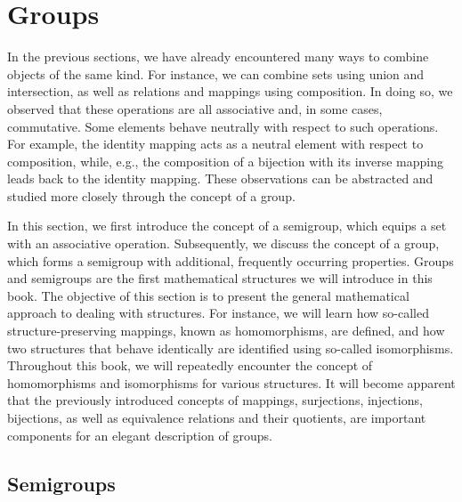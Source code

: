 \section{Groups}

In the previous sections, we have already encountered many ways to combine objects of the same kind. For instance, we can combine sets using union and intersection, as well as relations and mappings using composition. In doing so, we observed that these operations are all associative and, in some cases, commutative. Some elements behave neutrally with respect to such operations. For example, the identity mapping acts as a neutral element with respect to composition, while, e.g., the composition of a bijection with its inverse mapping leads back to the identity mapping. These observations can be abstracted and studied more closely through the concept of a group.

In this section, we first introduce the concept of a semigroup, which equips a set with an associative operation. Subsequently, we discuss the concept of a group, which forms a semigroup with additional, frequently occurring properties. Groups and semigroups are the first mathematical structures we will introduce in this book. The objective of this section is to present the general mathematical approach to dealing with structures. For instance, we will learn how so-called structure-preserving mappings, known as homomorphisms, are defined, and how two structures that behave identically are identified using so-called isomorphisms. Throughout this book, we will repeatedly encounter the concept of homomorphisms and isomorphisms for various structures. It will become apparent that the previously introduced concepts of mappings, surjections, injections, bijections, as well as equivalence relations and their quotients, are important components for an elegant description of groups.

\subsection{Semigroups}

